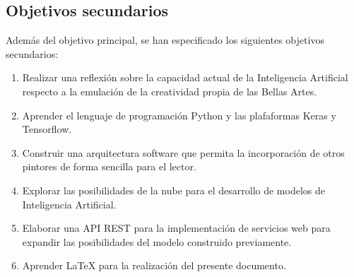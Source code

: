 \documentclass[../main.tex]{subfiles}
\begin{document}
\subsection{Objetivos secundarios}
Además del objetivo principal, se han especificado los siguientes objetivos secundarios:
\begin{enumerate}
    \item Realizar una reflexión sobre la capacidad actual de la Inteligencia Artificial respecto a la emulación de la creatividad propia de las Bellas Artes.
    \item Aprender el lenguaje de programación Python y las plafaformas Keras y Tensorflow.
    \item Construir una arquitectura software que permita la incorporación de otros pintores de forma sencilla para el lector.
    \item Explorar las posibilidades de la nube para el desarrollo de modelos de Inteligencia Artificial.
    \item Elaborar una API REST para la implementación de servicios web para expandir las posibilidades del modelo construido previamente.
    \item Aprender \LaTeX{} para la realización del presente documento.
\end{enumerate}
\end{document}
